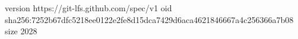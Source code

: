 version https://git-lfs.github.com/spec/v1
oid sha256:7252b67dfc5218ee0122e2fe8d15dca7429d6aca4621846667a4c256366a7b08
size 2028
